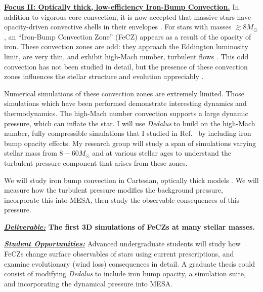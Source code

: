 \documentclass[12pt]{article}
\newcommand{\sct}[1]{\vspace{0.3cm}\hspace{-\parindent}\textbf{\underline{#1}}\hspace{0.3cm}}
\begin{document}
\sct{Focus II: Optically thick, low-efficiency Iron-Bump Convection.}
In addition to vigorous core convection, it is now accepted that massive stars have opacity-driven convective shells in their envelopes \citep{cantiello_etal_2009}.
For stars with masses $\gtrsim 8 M_{\odot}$, an ``Iron-Bump Convection Zone'' (FeCZ) appears as a result of the opacity of iron.
These convection zones are odd: they approach the Eddington luminosity limit, are very thin, and exhibit high-Mach number, turbulent flows \citep{jermyn_etal_2022_atlas}.
This odd convection has not been studied in detail, but the presence of these convection zones influences the stellar structure and evolution appreciably \citep{kohler_etal_2015}.


Numerical simulations of these convection zones are extremely limited.
Those simulations which have been performed \citep{jiang_etal_2015, schultz_etal_2020} demonstrate interesting dynamics and thermodynamics.
The high-Mach number convection supports a large dynamic pressure, which can inflate the star.
I will use \emph{Dedalus} to build on the high-Mach number, fully compressible simulations that I studied in Ref.~\citep{anders_brown_2017} by including iron bump opacity effects.
My research group will study a span of simulations varying stellar mass from $8-60 M_{\odot}$ and at various stellar ages to understand the turbulent pressure component that arises from these zones.

We will study iron bump convection in Cartesian, optically thick models \citep[good approximations,][]{jermyn_etal_2022_atlas}.
We will measure how the turbulent pressure modifies the background pressure, incorporate this into MESA, then study the observable consequences of this pressure.

\textbf{\underline{\emph{Deliverable:}} The first 3D simulations of FeCZs at many stellar masses.}

\textbf{\underline{\emph{Student Opportunities:}}} Advanced undergraduate students will study how FeCZs change surface observables of stars using current prescriptions, and examine evolutionary (wind loss) consequences in detail.
A graduate thesis could consist of modifying \emph{Dedalus} to include iron bump opacity, a simulation suite, and incorporating the dynamical pressure into MESA.
\end{document}
